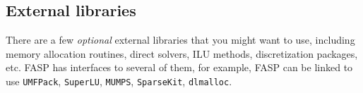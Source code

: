 \documentclass[11pt]{memoir}
\begin{document}

\subsection{External libraries}\label{ssec:lib}

There are a few \emph{optional} external libraries that you might want
to use, including memory allocation routines, direct solvers, ILU
methods, discretization packages, etc. FASP has interfaces to several
of them, for example, FASP can be linked to use \verb|UMFPack|, \verb|SuperLU|, \verb|MUMPS|,
\verb|SparseKit|, \verb|dlmalloc|.
\end{document}
